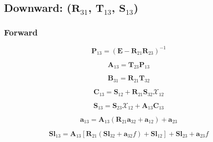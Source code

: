 %
\subsection{Downward: ($\mathbf{R}_{31}$, $\mathbf{T}_{13}$, $\mathbf{S}_{13}$)}
\label{sec:downward}

\subsubsection{Forward}
\label{sec:adding-downward-forward}

\begin{equation}
\mathbf{P}_{13} = (\mathbf{E} - \mathbf{R}_{21}\mathbf{R}_{23})^{-1}
\label{eq:adding-downward-forward-P13}
\end{equation}

\begin{equation}
\mathbf{A}_{13} = \mathbf{T}_{23}\mathbf{P}_{13}
\label{eq:adding-downward-forward-B13}
\end{equation}

\begin{equation}
\mathbf{B}_{31} = \mathbf{R}_{21}\mathbf{T}_{32}
\label{eq:adding-downward-forward-B31}
\end{equation}

\begin{equation}
\mathbf{C}_{13} = \mathbf{S}_{12} + \mathbf{R}_{21}\mathbf{S}_{32}\mathcal{X}_{12}
\label{eq:adding-downward-forward-C13}
\end{equation}

\begin{equation}
\mathbf{S}_{13} = \mathbf{S}_{23}\mathcal{X}_{12} + \mathbf{A}_{13}\mathbf{C}_{13}
\label{eq:adding-downward-forward-S13}
\end{equation}

\begin{equation}
\mathbf{a}_{13} = \mathbf{A}_{13}(\mathbf{R}_{21}\mathbf{a}_{32} + \mathbf{a}_{12}) + \mathbf{a}_{23}
\label{eq:adding-up_a13}
\end{equation}

\begin{equation}
\mathbf{Sl}_{13} = \mathbf{A}_{13}\left[\mathbf{R}_{21}(\mathbf{Sl}_{32} + \mathbf{a}_{32}f) + \mathbf{Sl}_{12}\right] + \mathbf{Sl}_{23} + \mathbf{a}_{23}f
\label{eq:adding-downward-forward-Sl13}
\end{equation}

